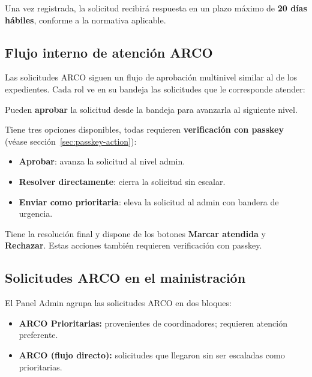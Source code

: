 \documentclass[11pt,twoside]{article}
\begin{document}
\begin{nota}
Una vez registrada, la solicitud recibirá respuesta en un plazo máximo de
\textbf{20 días hábiles}, conforme a la normativa aplicable.
\end{nota}

\subsection{Flujo interno de atención ARCO}

Las solicitudes ARCO siguen un flujo de aprobación multinivel similar al de
los expedientes. Cada rol ve en su bandeja las solicitudes que le corresponde
atender:

\begin{description}[leftmargin=2em]
  \item[Usuario y Operativo] Pueden \textbf{aprobar} la solicitud desde la
    bandeja para avanzarla al siguiente nivel.
  \item[Coordinador] Tiene tres opciones disponibles, todas requieren
    \textbf{verificación con passkey} (véase sección~\ref{sec:passkey-action}):
    \begin{itemize}
      \item \textbf{Aprobar}: avanza la solicitud al nivel admin.
      \item \textbf{Resolver directamente}: cierra la solicitud sin escalar.
      \item \textbf{Enviar como prioritaria}: eleva la solicitud al admin con
        bandera de urgencia.
    \end{itemize}
  \item[Administrador] Tiene la resolución final y dispone de los botones
    \textbf{Marcar atendida} y \textbf{Rechazar}. Estas acciones también
    requieren verificación con passkey.
\end{description}

\subsection{Solicitudes ARCO en el mainistración}

El Panel Admin agrupa las solicitudes ARCO en dos bloques:

\begin{itemize}[leftmargin=2em]
  \item \textbf{ARCO Prioritarias:} provenientes de coordinadores; requieren
    atención preferente.
  \item \textbf{ARCO (flujo directo):} solicitudes que llegaron sin ser
    escaladas como prioritarias.
\end{itemize}
\end{document}
